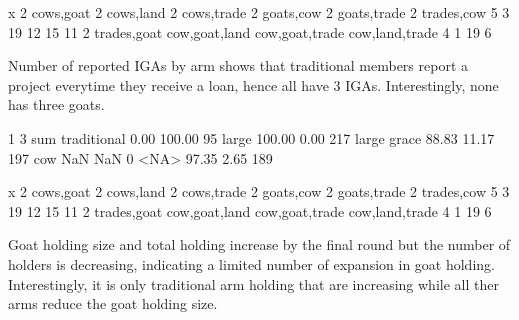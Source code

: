 \begin{Schunk}
\begin{Soutput}
x
   2 cows,goat    2 cows,land   2 cows,trade    2 goats,cow  2 goats,trade   2 trades,cow 
             5              3             19             12             15             11 
 2 trades,goat  cow,goat,land cow,goat,trade cow,land,trade 
             4              1             19              6 
\end{Soutput}
\end{Schunk}
Number of reported IGAs by arm shows that \textsf{traditional} members report a project everytime they receive a loan, hence all have 3 IGAs. Interestingly, none has three goats.
\begin{Schunk}
\begin{Soutput}
                 1      3 sum
traditional   0.00 100.00  95
large       100.00   0.00 217
large grace  88.83  11.17 197
cow            NaN    NaN   0
<NA>         97.35   2.65 189
\end{Soutput}
\begin{Soutput}
x
   2 cows,goat    2 cows,land   2 cows,trade    2 goats,cow  2 goats,trade   2 trades,cow 
             5              3             19             12             15             11 
 2 trades,goat  cow,goat,land cow,goat,trade cow,land,trade 
             4              1             19              6 
\end{Soutput}
\end{Schunk}

Goat holding size and total holding increase by the final round but the number of holders is decreasing, indicating a limited number of expansion in goat holding. Interestingly, it is only \textsf{traditional} arm holding that are increasing while all ther arms reduce the goat holding size.

